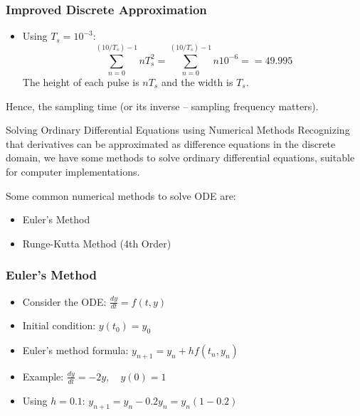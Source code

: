 \documentclass[aspectratio=169,xcolor=dvipsnames,svgnames,x11names,fleqn]{beamer}
\begin{document}
\begin{frame}
\frametitle{Improved Discrete Approximation}
\begin{itemize}
    \item Using \( T_s = 10^{-3} \):
    $$
    \sum_{n=0}^{(10/T_s)-1} nT_s^2 = \sum_{n=0}^{(10/T_s)-1} n 10^{-6} = = 49.995
    $$
    The height of each pulse is $nT_s$ and the width is $T_s$.
\end{itemize}

Hence, the sampling time (or its inverse -- sampling frequency matters).
\end{frame}

\begin{frame}{Solving Ordinary Differential Equations using Numerical Methods}
Recognizing that derivatives can be approximated as difference equations in the discrete domain, we have some methods to solve ordinary differential equations, suitable for computer implementations.

Some common numerical methods to solve ODE are:
\begin{itemize}
    \item Euler's Method
    \item Runge-Kutta Method (4th Order)
\end{itemize}
\end{frame}

\begin{frame}
\frametitle{Euler's Method}
\begin{itemize}
    \item Consider the ODE: $ \frac{dy}{dt} = f(t, y) $
    \item Initial condition: $ y(t_0) = y_0 $
    \item Euler's method formula: $ y_{n+1} = y_n + h f(t_n, y_n) $
    \item Example: $ \frac{dy}{dt} = -2y, \quad y(0) = 1 $
    \item Using $ h = 0.1 $: $ y_{n+1} = y_n - 0.2y_n = y_n(1 - 0.2) $
\end{itemize}
\end{frame}
\end{document}

